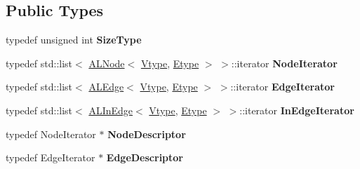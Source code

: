\subsection*{Public Types}
\begin{DoxyCompactItemize}
\item 
\hypertarget{class_adjacency_list_impl_a698b4d38aef1dbefe87a37a424949ad2}{
typedef unsigned int {\bfseries SizeType}}
\label{class_adjacency_list_impl_a698b4d38aef1dbefe87a37a424949ad2}

\item 
\hypertarget{class_adjacency_list_impl_a37adb7df7c9d4f08de8b167a845c5b8d}{
typedef std::list$<$ \hyperlink{class_a_l_node}{ALNode}$<$ \hyperlink{class_vtype}{Vtype}, \hyperlink{class_etype}{Etype} $>$ $>$::iterator {\bfseries NodeIterator}}
\label{class_adjacency_list_impl_a37adb7df7c9d4f08de8b167a845c5b8d}

\item 
\hypertarget{class_adjacency_list_impl_a78f5d0642110528859e9844dcff6539d}{
typedef std::list$<$ \hyperlink{class_a_l_edge}{ALEdge}$<$ \hyperlink{class_vtype}{Vtype}, \hyperlink{class_etype}{Etype} $>$ $>$::iterator {\bfseries EdgeIterator}}
\label{class_adjacency_list_impl_a78f5d0642110528859e9844dcff6539d}

\item 
\hypertarget{class_adjacency_list_impl_a0e6f02438f794d48f101a4b1d7912064}{
typedef std::list$<$ \hyperlink{class_a_l_in_edge}{ALInEdge}$<$ \hyperlink{class_vtype}{Vtype}, \hyperlink{class_etype}{Etype} $>$ $>$::iterator {\bfseries InEdgeIterator}}
\label{class_adjacency_list_impl_a0e6f02438f794d48f101a4b1d7912064}

\item 
\hypertarget{class_adjacency_list_impl_a9a240a9affed9619bb41032a1f203869}{
typedef NodeIterator $\ast$ {\bfseries NodeDescriptor}}
\label{class_adjacency_list_impl_a9a240a9affed9619bb41032a1f203869}

\item 
\hypertarget{class_adjacency_list_impl_a7d24336e5c448130a525e82409a425f5}{
typedef EdgeIterator $\ast$ {\bfseries EdgeDescriptor}}
\label{class_adjacency_list_impl_a7d24336e5c448130a525e82409a425f5}

\end{DoxyCompactItemize}
